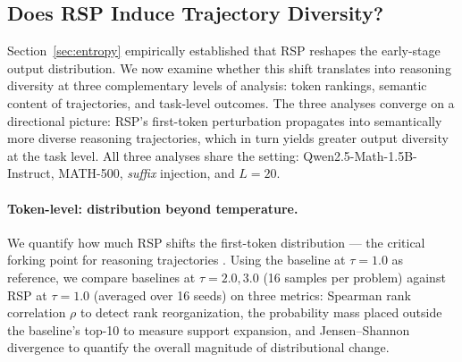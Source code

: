 \subsection{Does RSP Induce Trajectory Diversity?}\label{sec:diversity}

Section~\ref{sec:entropy} empirically established that RSP reshapes the early-stage output distribution. We now examine whether this shift translates into reasoning diversity at three complementary levels of analysis: token rankings, semantic content of trajectories, and task-level outcomes. The three analyses converge on a directional picture: RSP's first-token perturbation propagates into semantically more diverse reasoning trajectories, which in turn yields greater output diversity at the task level. All three analyses share the setting: Qwen2.5-Math-1.5B-Instruct, MATH-500, \emph{suffix} injection, and $L=20$.

\paragraph{Token-level: distribution beyond temperature.}
We quantify how much RSP shifts the first-token distribution --- the critical forking point for reasoning trajectories \citep{wang2025beyond}. Using the baseline at $\tau{=}1.0$ as reference, we compare baselines at $\tau{=}2.0,3.0$ (16 samples per problem) against RSP at $\tau{=}1.0$ (averaged over 16 seeds) on three metrics: Spearman rank correlation $\rho$ to detect rank reorganization, the probability mass placed outside the baseline's top-10 to measure support expansion, and Jensen--Shannon divergence to quantify the overall magnitude of distributional change.

